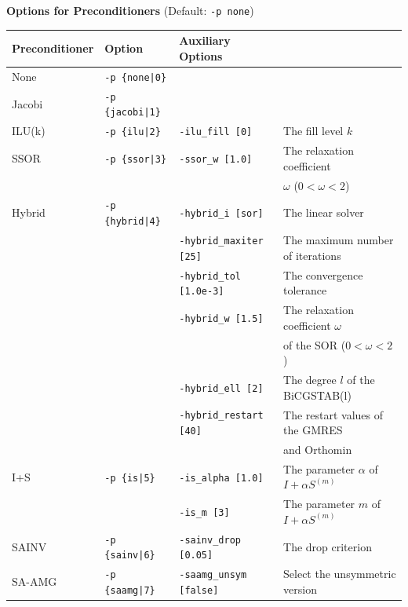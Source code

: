 \documentclass[a4paper]{article}
\begin{document}
\\ \\
\begin{minipage}[t]{\textwidth}
\begin{center}
{\bf Options for Preconditioners} (Default: \verb=-p none=)\\
\begin{tabular}{l|lll}\hline\hline
Preconditioner   & Option           & Auxiliary Options \\ \hline
None     & \verb=-p {none|0}=    &   \\
Jacobi   & \verb=-p {jacobi|1}=  &     \\
ILU(k)   & \verb=-p {ilu|2}=     & \verb=-ilu_fill [0]=        & The fill level $k$ \\
SSOR     & \verb=-p {ssor|3}=    & \verb=-ssor_w [1.0]=        & The relaxation coefficient \\
         &                       &                             & $\omega$ ($0<\omega<2$) \\
Hybrid   & \verb=-p {hybrid|4}=  & \verb=-hybrid_i [sor]=      & The linear solver\\
         &                       & \verb=-hybrid_maxiter [25]= & The maximum number of iterations \\
         &                       & \verb=-hybrid_tol [1.0e-3]= & The convergence tolerance \\
         &                       & \verb=-hybrid_w [1.5]=      & The relaxation coefficient $\omega$ \\
         &                       &                             & of the SOR ($0<\omega<2$) \\
         &                       & \verb=-hybrid_ell [2]=      & The degree $l$ of the BiCGSTAB(l) \\
         &                       & \verb=-hybrid_restart [40]= & The restart values of the GMRES \\
         &                       &                             & and Orthomin \\
I+S      & \verb=-p {is|5}=      & \verb=-is_alpha [1.0]=      & The parameter $\alpha$ of $I+\alpha S^{(m)}$ \\
         &                       & \verb=-is_m [3]=            & The parameter $m$ of $I+\alpha S^{(m)}$ \\
SAINV    & \verb=-p {sainv|6}=   & \verb=-sainv_drop [0.05]=   & The drop criterion\\
SA-AMG   & \verb=-p {saamg|7}=   & \verb=-saamg_unsym [false]= & Select the unsymmetric version    \\

\end{tabular}
\end{center}
\end{minipage}
\end{document}
